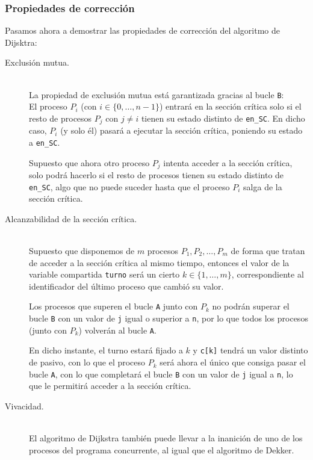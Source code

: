 \subsubsection{Propiedades de corrección}
\noindent
Pasamos ahora a demostrar las propiedades de corrección del algoritmo de Dijsktra:

\begin{description}
    \item [Exclusión mutua.]~\\
        La propiedad de exclusión mutua está garantizada gracias al bucle \verb|B|:\\
        El proceso $P_i$ (con $i \in \{0,\ldots,n-1\}$) entrará en la sección crítica solo si el resto de procesos $P_j$ con $j\neq i$ tienen su estado distinto de \verb|en_SC|. En dicho caso, $P_i$ (y solo él) pasará a ejecutar la sección crítica, poniendo su estado a \verb|en_SC|. 

        Supuesto que ahora otro proceso $P_j$ intenta acceder a la sección crítica, solo podrá hacerlo si el resto de procesos tienen su estado distinto de \verb|en_SC|, algo que no puede suceder hasta que el proceso $P_i$ salga de la sección crítica.
    \item [Alcanzabilidad de la sección crítica.]~\\
        Supuesto que disponemos de $m$ procesos $P_1, P_2, \ldots, P_m$ de forma que tratan de acceder a la sección crítica al mismo tiempo, entonces el valor de la variable compartida \verb|turno| será un cierto $k \in \{1,\ldots,m\}$, correspondiente al identificador del último proceso que cambió su valor. 

        Los procesos que superen el bucle \verb|A| junto con $P_k$ no podrán superar el bucle \verb|B| con un valor de \verb|j| igual o superior a \verb|n|, por lo que todos los procesos (junto con $P_k$) volverán al bucle \verb|A|.

        En dicho instante, el turno estará fijado a $k$ y \verb|c[k]| tendrá un valor distinto de pasivo, con lo que el proceso $P_k$ será ahora el único que consiga pasar el bucle \verb|A|, con lo que completará el bucle \verb|B| con un valor de \verb|j| igual a \verb|n|, lo que le permitirá acceder a la sección crítica.

    \item [Vivacidad.]~\\
        El algoritmo de Dijkstra también puede llevar a la inanición de uno de los procesos del programa concurrente, al igual que el algoritmo de Dekker.


\end{description}
